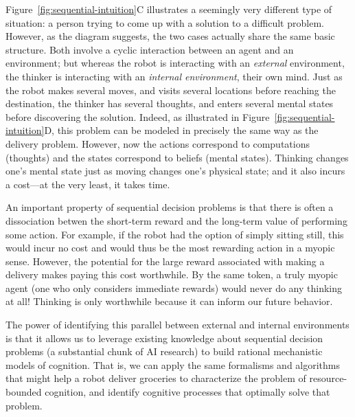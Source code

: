 Figure~\ref{fig:sequential-intuition}C illustrates a seemingly very different type of situation: a person trying to come up with a solution to a difficult problem. However, as the diagram suggests, the two cases actually share the same basic structure. Both involve a cyclic interaction between an agent and an environment; but whereas the robot is interacting with an \emph{external} environment, the thinker is interacting with an \emph{internal environment}, their own mind. Just as the robot makes several moves, and visits several locations before reaching the destination, the thinker has several thoughts, and enters several mental states before discovering the solution. Indeed, as illustrated in Figure~\ref{fig:sequential-intuition}D, this problem can be modeled in precisely the same way as the delivery problem. However, now the actions correspond to computations (thoughts) and the states correspond to beliefs (mental states). Thinking changes one's mental state just as moving changes one's physical state; and it also incurs a cost---at the very least, it takes time.

An important property of sequential decision problems is that there is often a dissociation betwen the short-term reward and the long-term value of performing some action. For example, if the robot had the option of simply sitting still, this would incur no cost and would thus be the most rewarding action in a myopic sense. However, the potential for the large reward associated with making a delivery makes paying this cost worthwhile. By the same token, a truly myopic agent (one who only considers immediate rewards) would never do any thinking at all! Thinking is only worthwhile because it can inform our future behavior.\footnotemark{}


The power of identifying this parallel between external and internal environments is that it allows us to leverage existing knowledge about sequential decision problems (a substantial chunk of AI research) to build rational mechanistic models of cognition. That is, we can apply the same formalisms and algorithms that might help a robot deliver groceries to characterize the problem of resource-bounded cognition, and identify cognitive processes that optimally solve that problem.


